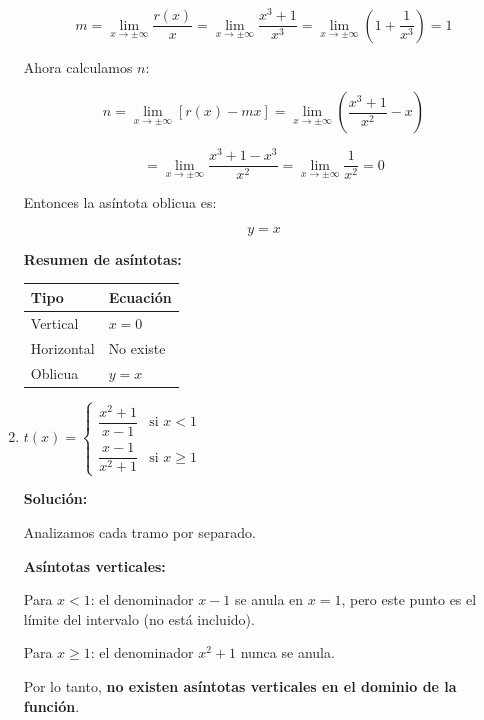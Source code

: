 \documentclass[12pt]{article}
\newcommand{\solucion}{%
    \vspace{0.8em}%
    \textbf{Solución:}%
}
\begin{document}
\begin{enumerate}[label=\alph*)]
    \[
    m = \lim_{x \to \pm\infty} \frac{r(x)}{x}
    =
    \lim_{x \to \pm\infty}
    \frac{x^3+1}{x^3}
    =
    \lim_{x \to \pm\infty}
    \left(1 + \frac{1}{x^3}\right)
    =
    1
    \]

    Ahora calculamos $n$:

    \[
    n = \lim_{x \to \pm\infty}
    \left[r(x) - mx\right]
    =
    \lim_{x \to \pm\infty}
    \left(
    \frac{x^3+1}{x^2} - x
    \right)
    \]

    \[
    =
    \lim_{x \to \pm\infty}
    \frac{x^3+1 - x^3}{x^2}
    =
    \lim_{x \to \pm\infty}
    \frac{1}{x^2}
    =
    0
    \]

    Entonces la asíntota oblicua es:

    \[
    \boxed{y = x}
    \]

    \newpage
    \vspace{0.5em}

    \textbf{Resumen de asíntotas:}

    \begin{center}
    \begin{tabular}{ll}
        \toprule
        Tipo & Ecuación \\
        \midrule
        Vertical & $x = 0$ \\
        Horizontal & No existe \\
        Oblicua & $y = x$ \\
        \bottomrule
    \end{tabular}
    \end{center}

    \item $t(x) = \begin{cases} \dfrac{x^2+1}{x-1} & \text{si } x < 1 \\[0.5em] \dfrac{x-1}{x^2+1} & \text{si } x \geq 1 \end{cases}$

    \solucion

    Analizamos cada tramo por separado.

    \textbf{Asíntotas verticales:}

    Para $x < 1$: el denominador $x - 1$ se anula en $x = 1$, pero este punto es el límite del intervalo (no está incluido).

    Para $x \geq 1$: el denominador $x^2 + 1$ nunca se anula.

    Por lo tanto, \textbf{no existen asíntotas verticales en el dominio de la función}.


\end{enumerate}
\end{document}
